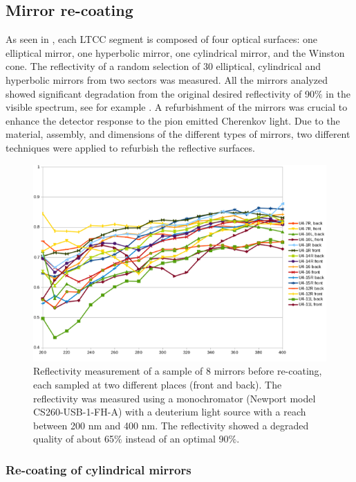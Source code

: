 \subsection{Mirror re-coating}

As seen in , each LTCC segment is composed of four optical surfaces: one elliptical mirror,
one hyperbolic mirror, one cylindrical mirror, and the Winston cone.
The reflectivity of a random selection of 30 elliptical, cylindrical and hyperbolic mirrors from two sectors was measured.
All the mirrors analyzed showed significant degradation from the original desired reflectivity of 90$\%$ in the visible spectrum,
see for example .
A refurbishment of the mirrors was crucial to enhance the detector response to the pion emitted Cherenkov light.
Due to the material, assembly, and dimensions of the different types of mirrors, two different techniques were applied to refurbish the
reflective surfaces.

\begin{figure}
\centering
	\includegraphics[width=1.0\columnwidth,keepaspectratio]{img/mirrorsReflectivityBefore.png}
	\caption{Reflectivity measurement of a sample of 8 mirrors before re-coating, each sampled at two different places (front and back). The reflectivity
				was measured using a monochromator (Newport model CS260-USB-1-FH-A) with a deuterium light source with a reach
            between 200 nm and 400 nm. The reflectivity showed a degraded quality of about 65$\%$ instead of an optimal 90$\%$.}
	\label{fig:reflectivityBefore}
\end{figure}


\subsubsection{Re-coating of cylindrical mirrors}

